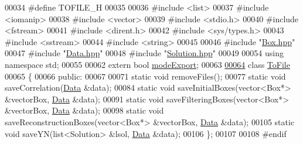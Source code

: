 \begin{DoxyCode}
00034 \textcolor{preprocessor}{}\textcolor{preprocessor}{#define TOFILE\_H}
00035 \textcolor{preprocessor}{}
00036 \textcolor{preprocessor}{#include <list>}
00037 \textcolor{preprocessor}{#include <iomanip>}
00038 \textcolor{preprocessor}{#include <vector>}
00039 \textcolor{preprocessor}{#include <stdio.h>}
00040 \textcolor{preprocessor}{#include <fstream>}
00041 \textcolor{preprocessor}{#include <dirent.h>}
00042 \textcolor{preprocessor}{#include <sys/types.h>}
00043 \textcolor{preprocessor}{#include <sstream>}
00044 \textcolor{preprocessor}{#include <string>}
00045 
00046 \textcolor{preprocessor}{#include "\hyperlink{Box_8hpp}{Box.hpp}"}
00047 \textcolor{preprocessor}{#include "\hyperlink{Data_8hpp}{Data.hpp}"}
00048 \textcolor{preprocessor}{#include "\hyperlink{Solution_8hpp}{Solution.hpp}"}
00049 
00054 \textcolor{keyword}{using namespace }std;
00055 
00062 \textcolor{keyword}{extern} \textcolor{keywordtype}{bool} \hyperlink{group__global_gaa1e2a21621a42fc9b5bfe20792f549cf}{modeExport};
00063 
\hypertarget{ToFile_8hpp_source_l00064}{}\hyperlink{classToFile}{00064} \textcolor{keyword}{class }\hyperlink{classToFile}{ToFile}
00065 \{
00066 \textcolor{keyword}{public}:
00067 
00071         \textcolor{keyword}{static} \textcolor{keywordtype}{void} removeFiles();
00077     \textcolor{keyword}{static} \textcolor{keywordtype}{void} saveCorrelation(\hyperlink{classData}{Data} &data);
00084     \textcolor{keyword}{static} \textcolor{keywordtype}{void} saveInitialBoxes(vector<Box*> &vectorBox, \hyperlink{classData}{Data} &data);
00091     \textcolor{keyword}{static} \textcolor{keywordtype}{void} saveFilteringBoxes(vector<Box*> &vectorBox, \hyperlink{classData}{Data} &data);
00098     \textcolor{keyword}{static} \textcolor{keywordtype}{void} saveReconstructionBoxes(vector<Box*> &vectorBox, \hyperlink{classData}{Data} &data);
00105     \textcolor{keyword}{static} \textcolor{keywordtype}{void} saveYN(list<Solution> &lsol, \hyperlink{classData}{Data} &data);
00106 \};
00107 
00108 \textcolor{preprocessor}{#endif}
\end{DoxyCode}

